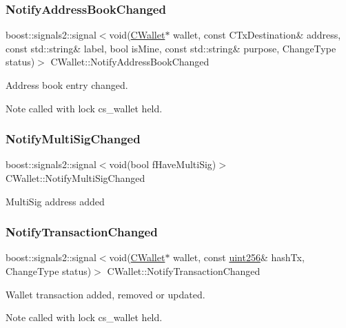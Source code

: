 \subsubsection{\texorpdfstring{Notify\+Address\+Book\+Changed}{NotifyAddressBookChanged}}
{\footnotesize\ttfamily boost\+::signals2\+::signal$<$void(\mbox{\hyperlink{class_c_wallet}{C\+Wallet}}$\ast$ wallet, const C\+Tx\+Destination\& address, const std\+::string\& label, bool is\+Mine, const std\+::string\& purpose, Change\+Type status)$>$ C\+Wallet\+::\+Notify\+Address\+Book\+Changed}

Address book entry changed. \begin{DoxyNote}{Note}
called with lock cs\+\_\+wallet held. 
\end{DoxyNote}
\mbox{\label{class_c_wallet_a26c4403efbfe8797d8bd386e6ac2de15}} 
\subsubsection{\texorpdfstring{Notify\+Multi\+Sig\+Changed}{NotifyMultiSigChanged}}
{\footnotesize\ttfamily boost\+::signals2\+::signal$<$void(bool f\+Have\+Multi\+Sig)$>$ C\+Wallet\+::\+Notify\+Multi\+Sig\+Changed}

Multi\+Sig address added \mbox{\label{class_c_wallet_a4cc32526b4e90faadf11a9bd022a956f}} 
\subsubsection{\texorpdfstring{Notify\+Transaction\+Changed}{NotifyTransactionChanged}}
{\footnotesize\ttfamily boost\+::signals2\+::signal$<$void(\mbox{\hyperlink{class_c_wallet}{C\+Wallet}}$\ast$ wallet, const \mbox{\hyperlink{classuint256}{uint256}}\& hash\+Tx, Change\+Type status)$>$ C\+Wallet\+::\+Notify\+Transaction\+Changed}

Wallet transaction added, removed or updated. \begin{DoxyNote}{Note}
called with lock cs\+\_\+wallet held. 
\end{DoxyNote}
\mbox{\label{class_c_wallet_abaeed8c343b4044453a4dd6ac08be906}} 
